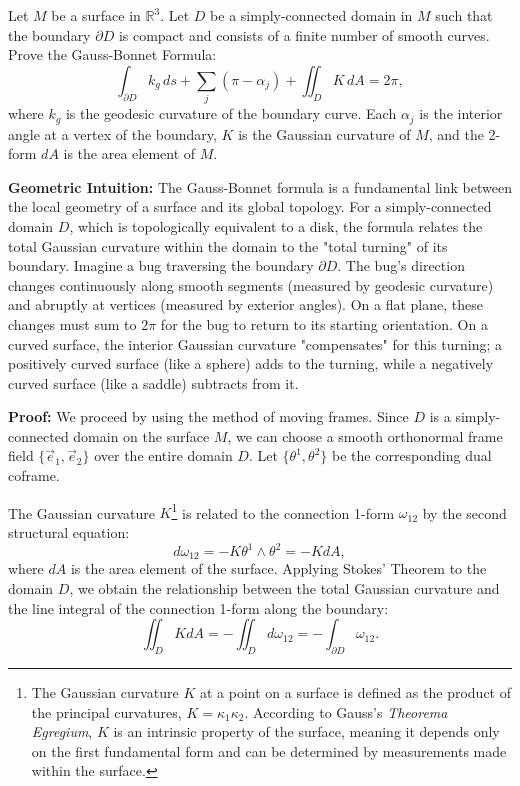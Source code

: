 \clearpage

\begin{exercise}
\label{geometry:2012:12}
Let $M$ be a surface in $\mathbb{R}^{3}$. Let $D$ be a simply-connected domain in $M$ such that the boundary $\partial D$ is compact and consists of a finite number of smooth curves. Prove the Gauss-Bonnet Formula:
\[ \int_{\partial D} k_{g}\, ds + \sum_{j}(\pi - \alpha_{j}) + \iint_{D} K\, dA = 2\pi, \]
where $k_{g}$ is the geodesic curvature of the boundary curve. Each $\alpha_{j}$ is the interior angle at a vertex of the boundary, $K$ is the Gaussian curvature of $M$, and the 2-form $dA$ is the area element of $M$.
\end{exercise}

\begin{solution}
\textbf{Geometric Intuition:} The Gauss-Bonnet formula is a fundamental link between the local geometry of a surface and its global topology. For a simply-connected domain $D$, which is topologically equivalent to a disk, the formula relates the total Gaussian curvature within the domain to the "total turning" of its boundary. Imagine a bug traversing the boundary $\partial D$. The bug's direction changes continuously along smooth segments (measured by geodesic curvature) and abruptly at vertices (measured by exterior angles). On a flat plane, these changes must sum to $2\pi$ for the bug to return to its starting orientation. On a curved surface, the interior Gaussian curvature "compensates" for this turning; a positively curved surface (like a sphere) adds to the turning, while a negatively curved surface (like a saddle) subtracts from it.

\textbf{Proof:}
We proceed by using the method of moving frames. Since $D$ is a simply-connected domain on the surface $M$, we can choose a smooth orthonormal frame field $\{\vec{e}_1, \vec{e}_2\}$ over the entire domain $D$. Let $\{\theta^1, \theta^2\}$ be the corresponding dual coframe.

The Gaussian curvature $K$\footnote{The Gaussian curvature $K$ at a point on a surface is defined as the product of the principal curvatures, $K = \kappa_1 \kappa_2$. According to Gauss's \textit{Theorema Egregium}, $K$ is an intrinsic property of the surface, meaning it depends only on the first fundamental form and can be determined by measurements made within the surface.} is related to the connection 1-form $\omega_{12}$ by the second structural equation:
\[ d\omega_{12} = -K \theta^1 \wedge \theta^2 = -K dA, \]
where $dA$ is the area element of the surface. Applying Stokes' Theorem to the domain $D$, we obtain the relationship between the total Gaussian curvature and the line integral of the connection 1-form along the boundary:
\[ \iint_D K dA = -\iint_D d\omega_{12} = -\int_{\partial D} \omega_{12}. \]


\end{solution}
